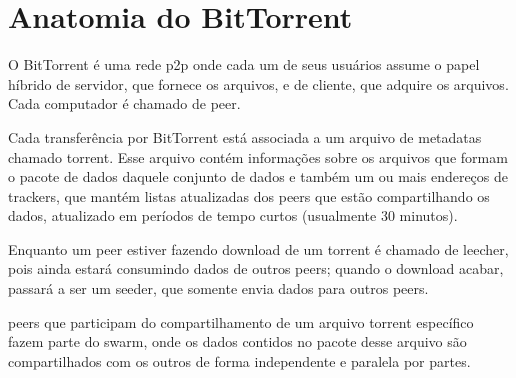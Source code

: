 
\chapter{Anatomia do BitTorrent}

O BitTorrent é uma rede \gls{p2p} onde cada um de seus usuários assume o papel híbrido
de servidor, que fornece os arquivos, e de cliente, que adquire os arquivos. Cada
computador é chamado de \gls{peer}.

Cada transferência por BitTorrent está associada a um arquivo de \glspl{metadata}
chamado \gls{torrent}. Esse arquivo contém informações sobre os arquivos que formam o
pacote de dados daquele conjunto de dados e também um ou mais endereços de
\glspl*{tracker}, que mantém listas atualizadas dos \glspl*{peer} que estão
compartilhando os dados, atualizado em períodos de tempo curtos (usualmente 30 minutos).

Enquanto um \gls*{peer} estiver fazendo download de um \gls*{torrent} é chamado de
\gls{leecher}, pois ainda estará consumindo dados de outros \glspl*{peer}; quando o
download acabar, passará a ser um \gls{seeder}, que somente envia dados para outros
\glspl*{peer}.

\Glspl*{peer} que participam do compartilhamento de um arquivo \gls*{torrent} específico
fazem parte do \gls{swarm}, onde os dados contidos no pacote desse arquivo são
compartilhados com os outros de forma independente e paralela por partes.

